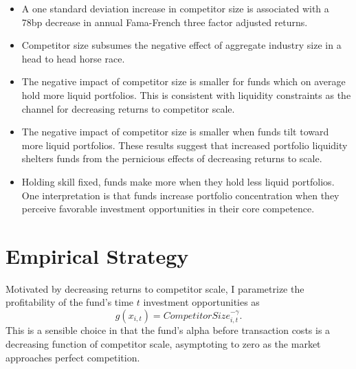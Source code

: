 \documentclass[]{book}
\providecommand{\tightlist}{%
  \setlength{\itemsep}{0pt}\setlength{\parskip}{0pt}}
\theoremstyle{definition}
\theoremstyle{definition}
\theoremstyle{definition}
\theoremstyle{remark}
\begin{document}
\begin{itemize}
\tightlist
\item
  A one standard deviation increase in competitor size is associated
  with a 78bp decrease in annual Fama-French three factor adjusted
  returns.
\item
  Competitor size subsumes the negative effect of aggregate industry
  size in a head to head horse race.
\item
  The negative impact of competitor size is smaller for funds which on
  average hold more liquid portfolios. This is consistent with liquidity
  constraints as the channel for decreasing returns to competitor scale.
\item
  The negative impact of competitor size is smaller when funds tilt
  toward more liquid portfolios. These results suggest that increased
  portfolio liquidity shelters funds from the pernicious effects of
  decreasing returns to scale.
\item
  Holding skill fixed, funds make more when they hold less liquid
  portfolios. One interpretation is that funds increase portfolio
  concentration when they perceive favorable investment opportunities in
  their core competence.
\end{itemize}

\hypertarget{empirical-strategy}{%
\section{Empirical Strategy}\label{empirical-strategy}}

Motivated by decreasing returns to competitor scale, I parametrize the
profitability of the fund's time \(t\) investment opportunities as
\begin{equation}
g(x_{i,t})=CompetitorSize_{i,t}^{-\gamma}. 
\label{eq:muParam}
\end{equation} This is a sensible choice in that the fund's alpha before
transaction costs is a decreasing function of competitor scale,
asymptoting to zero as the market approaches perfect competition.
\end{document}
